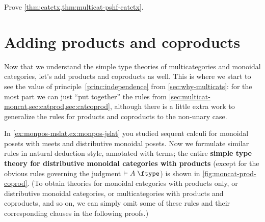 \begin{ex}\label{ex:catctx}
  Prove \cref{thm:catctx,thm:multicat-pshf-catctx}.
\end{ex}


\section{Adding products and coproducts}
\label{sec:multicat-prod-coprod}

Now that we understand the simple type theories of multicategories and monoidal categories, let's add products and coproducts as well.
This is where we start to see the value of principle~\eqref{princ:independence} from \cref{sec:why-multicats}: for the most part we can just ``put together'' the rules from \cref{sec:multicat-moncat,sec:catprod,sec:catcoprod}, although there is a little extra work to generalize the rules for products and coproducts to the non-unary case.

In \cref{ex:monpos-mslat,ex:monpos-jslat} you studied sequent calculi for monoidal posets with meets and distributive monoidal posets.
Now we formulate similar rules in natural deduction style, annotated with terms; the entire \textbf{simple type theory for distributive monoidal categories with products} (except for the obvious rules governing the judgment $\types A\type$) is shown in \cref{fig:moncat-prod-coprod}.
(To obtain theories for monoidal categories with products only, or distributive monoidal categories, or multicategories with products and coproducts, and so on, we can simply omit some of these rules and their corresponding clauses in the following proofs.)

